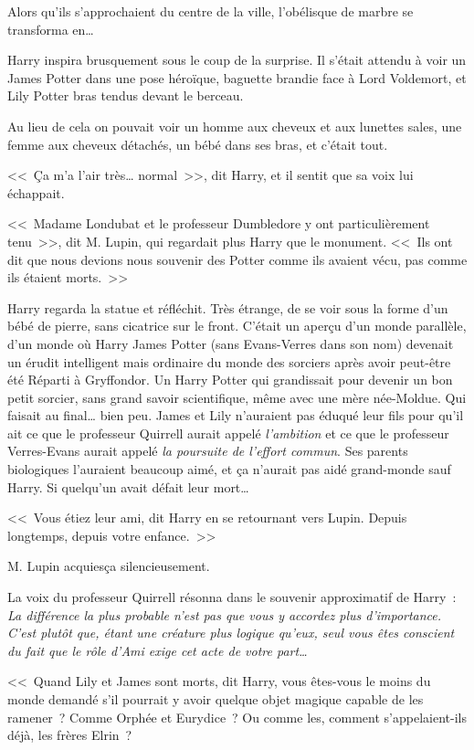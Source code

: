 Alors qu'ils s'approchaient du centre de la ville, l'obélisque de marbre se transforma en…

Harry inspira brusquement sous le coup de la surprise. Il s'était attendu à voir un James Potter dans une pose héroïque, baguette brandie face à Lord Voldemort, et Lily Potter bras tendus devant le berceau.

Au lieu de cela on pouvait voir un homme aux cheveux et aux lunettes sales, une femme aux cheveux détachés, un bébé dans ses bras, et c'était tout.

<<~Ça m'a l'air très… normal~>>, dit Harry, et il sentit que sa voix lui échappait.

<<~Madame Londubat et le professeur Dumbledore y ont particulièrement tenu~>>, dit M. Lupin, qui regardait plus Harry que le monument. <<~Ils ont dit que nous devions nous souvenir des Potter comme ils avaient vécu, pas comme ils étaient morts.~>>

Harry regarda la statue et réfléchit. Très étrange, de se voir sous la forme d'un bébé de pierre, sans cicatrice sur le front. C'était un aperçu d'un monde parallèle, d'un monde où Harry James Potter (sans Evans-Verres dans son nom) devenait un érudit intelligent mais ordinaire du monde des sorciers après avoir peut-être été Réparti à Gryffondor. Un Harry Potter qui grandissait pour devenir un bon petit sorcier, sans grand savoir scientifique, même avec une mère née-Moldue. Qui faisait au final… bien peu. James et Lily n'auraient pas éduqué leur fils pour qu'il ait ce que le professeur Quirrell aurait appelé \emph{l'ambition} et ce que le professeur Verres-Evans aurait appelé \emph{la poursuite de l'effort commun}. Ses parents biologiques l'auraient beaucoup aimé, et ça n'aurait pas aidé grand-monde sauf Harry. Si quelqu'un avait défait leur mort…

<<~Vous étiez leur ami, dit Harry en se retournant vers Lupin. Depuis longtemps, depuis votre enfance.~>>

M. Lupin acquiesça silencieusement.

La voix du professeur Quirrell résonna dans le souvenir approximatif de Harry~: \emph{La différence la plus probable n'est pas que vous y accordez plus d'importance. C'est plutôt que, étant une créature plus logique qu'eux, seul vous êtes conscient du fait que le rôle d'Ami exige cet acte de votre part…}

<<~Quand Lily et James sont morts, dit Harry, vous êtes-vous le moins du monde demandé s'il pourrait y avoir quelque objet magique capable de les ramener~? Comme Orphée et Eurydice~? Ou comme les, comment s'appelaient-ils déjà, les frères Elrin~?

